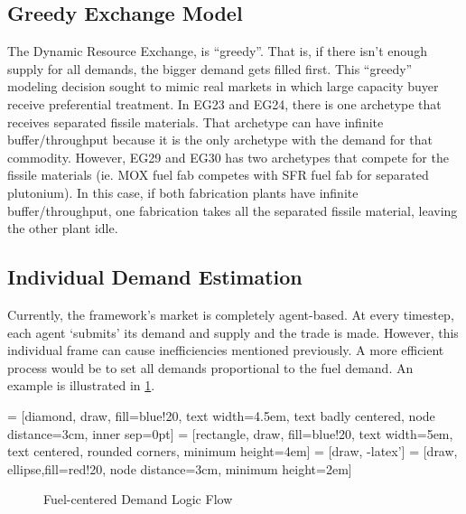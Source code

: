 \subsection{Greedy Exchange Model}
The \Cyclus Dynamic Resource Exchange, is ``greedy''. That is,  if there isn't
enough supply for all demands, the bigger demand gets filled first.
This ``greedy'' modeling decision sought to mimic real markets in which large capacity
buyer receive preferential treatment. 
In EG23 and EG24,
there is one archetype that receives separated fissile materials. That archetype
can have infinite buffer/throughput because it is the only
archetype with the demand for that commodity. However, EG29 and EG30 has two archetypes
that compete for the fissile materials (ie. \gls{MOX} fuel fab competes with \gls{SFR} fuel fab for separated plutonium).
In this case, if both fabrication plants have infinite buffer/throughput, one fabrication takes all the
separated fissile material, leaving the other plant idle.


\subsection{Individual Demand Estimation}
Currently, the \Cyclus framework's market is completely agent-based. At every timestep, each agent `submits' its
demand and supply and the trade is made. However, this individual frame can cause inefficiencies mentioned previously.
A more efficient process would be to set all demands proportional to the fuel demand. An example is illustrated
in \cref{diag:hd}.

 = [diamond, draw, fill=blue!20, 
text width=4.5em, text badly centered, node distance=3cm, inner sep=0pt]
 = [rectangle, draw, fill=blue!20, 
text width=5em, text centered, rounded corners, minimum height=4em]
 = [draw, -latex']
 = [draw, ellipse,fill=red!20, node distance=3cm,
minimum height=2em]


\begin{figure}
	\centering
	\caption{Fuel-centered Demand Logic Flow}
	\label{diag:hd}
\end{figure}
 


